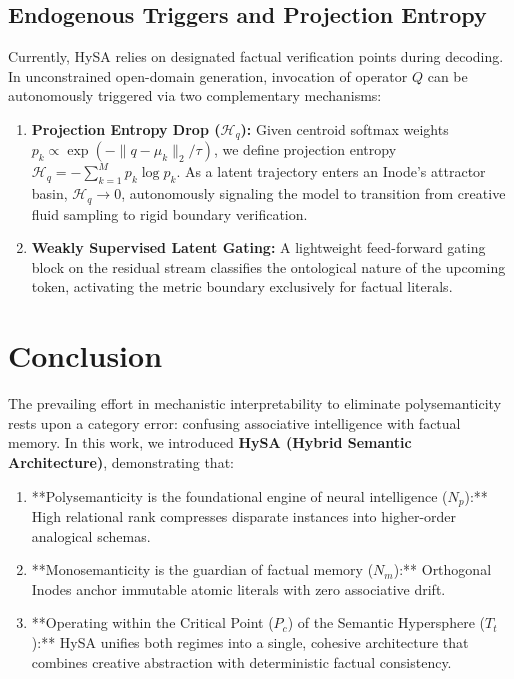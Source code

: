 \documentclass[11pt,a4paper]{article}
\theoremstyle{definition}
\begin{document}
\subsection{Endogenous Triggers and Projection Entropy}
Currently, HySA relies on designated factual verification points during decoding. In unconstrained open-domain generation, invocation of operator $Q$ can be autonomously triggered via two complementary mechanisms:
\begin{enumerate}[leftmargin=*, itemsep=2.0pt]
    \item \textbf{Projection Entropy Drop ($\mathcal{H}_q$):} Given centroid softmax weights $p_k \propto \exp(-\|q - \mu_k\|_2 / \tau)$, we define projection entropy $\mathcal{H}_q = -\sum_{k=1}^M p_k \log p_k$. As a latent trajectory enters an Inode's attractor basin, $\mathcal{H}_q \to 0$, autonomously signaling the model to transition from creative fluid sampling to rigid boundary verification.
    \item \textbf{Weakly Supervised Latent Gating:} A lightweight feed-forward gating block on the residual stream classifies the ontological nature of the upcoming token, activating the metric boundary exclusively for factual literals.
\end{enumerate}

\section{Conclusion}

The prevailing effort in mechanistic interpretability to eliminate polysemanticity rests upon a category error: confusing associative intelligence with factual memory. In this work, we introduced \textbf{HySA (Hybrid Semantic Architecture)}, demonstrating that:
\begin{enumerate}[leftmargin=*, itemsep=1.5pt]
    \item **Polysemanticity is the foundational engine of neural intelligence ($N_p$):** High relational rank compresses disparate instances into higher-order analogical schemas.
    \item **Monosemanticity is the guardian of factual memory ($N_m$):** Orthogonal Inodes anchor immutable atomic literals with zero associative drift.
    \item **Operating within the Critical Point ($P_c$) of the Semantic Hypersphere ($T_t$):** HySA unifies both regimes into a single, cohesive architecture that combines creative abstraction with deterministic factual consistency.
\end{enumerate}
\end{document}
